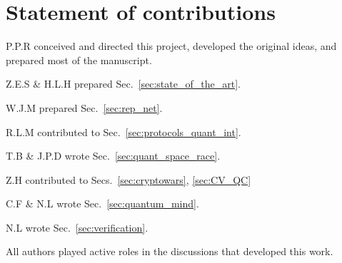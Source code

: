 %
%

\section*{Statement of contributions}

P.P.R conceived and directed this project, developed the original ideas, and prepared most of the manuscript.

Z.E.S \& H.L.H prepared Sec.~\ref{sec:state_of_the_art}.

W.J.M prepared Sec.~\ref{sec:rep_net}. 

R.L.M contributed to Sec.~\ref{sec:protocols_quant_int}.

T.B \& J.P.D wrote Sec.~\ref{sec:quant_space_race}.

Z.H contributed to Secs.~\ref{sec:cryptowars}, \ref{sec:CV_QC}

C.F \& N.L wrote Sec.~\ref{sec:quantum_mind}.

N.L wrote Sec.~\ref{sec:verification}.

All authors played active roles in the discussions that developed this work. 

